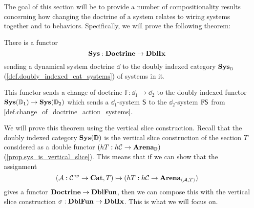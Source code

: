 \documentclass[DynamicalBook]{subfiles}
\begin{document}
The goal of this section will be to provide a number of compositionality results
concerning how changing the doctrine of a system relates to wiring systems
together and to behaviors. Specifically, we will prove the following theorem:
\begin{theorem}\label{thm.functoriality_system_construction}
  There is a functor 
\[
\textbf{Sys} : \textbf{Doctrine} \to \textbf{DblIx}
\]
sending a dynamical system doctrine $\dd$ to the doubly indexed category
$\textbf{Sys}_{\mathbb{D}}$ (\cref{def.doubly_indexed_cat_systems}) of systems in it. 

This functor sends a change of doctrine $\mathbb{F} : \dd_1 \to \dd_2$ to the doubly indexed functor $\textbf{Sys}(\mathbb{D}_1)
\to \textbf{Sys}(\mathbb{D}_2)$ which sends a $\dd_1$-system $\mathsf{S}$ to the
$\dd_2$-system $\mathbb{F}\mathsf{S}$ from \cref{def.change_of_doctrine_action_systems}.
\end{theorem}

We will prove this theorem using the vertical slice construction. Recall that
the doubly indexed category $\textbf{Sys}(\mathbb{D})$ is the vertical slice construction
of the section $T$ considered as a double functor $(hT : h\mathcal{C} \to
\textbf{Arena}_{\mathbb{D}})$ (\cref{prop.sys_is_vertical_slice}). This means that if we
can show that the assignment 
\[
(\mathcal{A} : \mathcal{C}^{\textnormal{op}} \to \textbf{Cat}, T) \mapsto (hT : h\mathcal{C} \to
\textbf{Arena}_{(\mathcal{A}, T)})
\]
gives a functor $\textbf{Doctrine} \to \textbf{DblFun}$, then we can compose this with
the vertical slice construction $\sigma : \textbf{DblFun} \to \textbf{DblIx}$. This is
what we will focus on.
\end{document}
